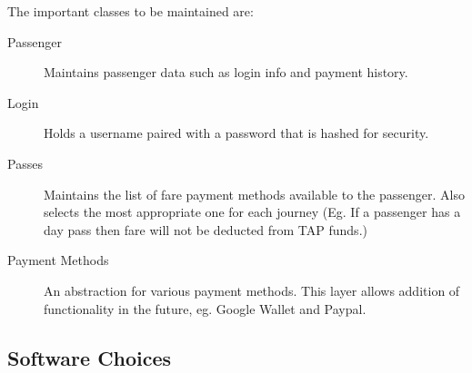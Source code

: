 The important classes to be maintained are:\begin{description}
\item[Passenger] Maintains passenger data such as login info and payment history.
\item[Login] Holds a username paired with a password that is hashed for security.
\item[Passes] Maintains the list of fare payment methods available to the passenger. Also selects the most appropriate one for each journey (Eg. If a passenger has a day pass then fare will not be deducted from TAP funds.)
\item[Payment Methods] An abstraction for various payment methods. This layer allows addition of functionality in the future, eg. Google Wallet and Paypal.
\end{description}

\subsection{Software Choices}